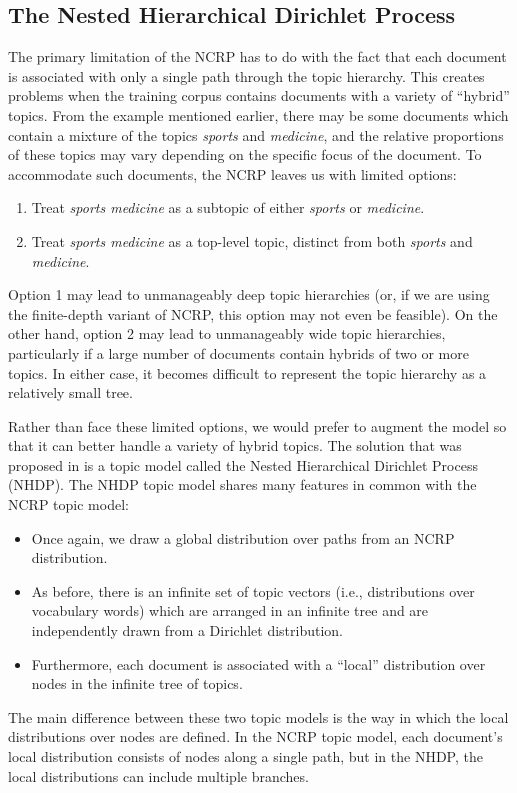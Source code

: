 \documentclass{article}
\begin{document}
\subsection{The Nested Hierarchical Dirichlet Process}

The primary limitation of the NCRP has to do with the fact that each document is associated with only a single path through the topic hierarchy.
This creates problems when the training corpus contains documents with a variety of ``hybrid'' topics.
From the example mentioned earlier, there may be some documents which contain a mixture of the topics \emph{sports} and \emph{medicine}, and the relative proportions of these topics may vary depending on the specific focus of the document.
To accommodate such documents, the NCRP leaves us with limited options:
\begin{enumerate}
\item Treat \emph{sports medicine} as a subtopic of either \emph{sports} or \emph{medicine}.
\item Treat \emph{sports medicine} as a top-level topic, distinct from both \emph{sports} and \emph{medicine}.
\end{enumerate}
Option 1 may lead to unmanageably deep topic hierarchies (or, if we are using the finite-depth variant of NCRP, this option may not even be feasible).
On the other hand, option 2 may lead to unmanageably wide topic hierarchies, particularly if a large number of documents contain hybrids of two or more topics.
In either case, it becomes difficult to represent the topic hierarchy as a relatively small tree.

Rather than face these limited options, we would prefer to augment the model so that it can better handle a variety of hybrid topics.
The solution that was proposed in \cite{paisley2015nhdp} is a topic model called the Nested Hierarchical Dirichlet Process (NHDP).
The NHDP topic model shares many features in common with the NCRP topic model:
\begin{itemize}
\item Once again, we draw a global distribution over paths from an NCRP distribution.
\item As before, there is an infinite set of topic vectors (i.e., distributions over vocabulary words) which are arranged in an infinite tree and are independently drawn from a Dirichlet distribution.
\item Furthermore, each document is associated with a ``local'' distribution over nodes in the infinite tree of topics.
\end{itemize}
The main difference between these two topic models is the way in which the local distributions over nodes are defined.
In the NCRP topic model, each document's local distribution consists of nodes along a single path, but in the NHDP, the local distributions can include multiple branches.
\end{document}

